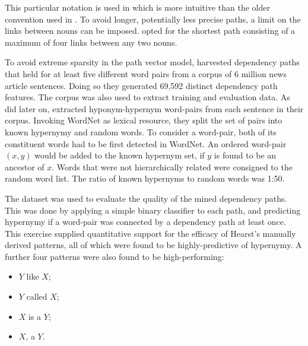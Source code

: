 This particular notation is used in \cite{shwartz2016path} which is more intuitive than the older convention used in \cite{Snow2004}.  To avoid longer, potentially less precise paths, a limit on the links between nouns can be imposed.  \citeauthor{Snow2004} opted for the shortest path consisting of a maximum of four links between any two nouns.

To avoid extreme sparsity in the path vector model, \citet{Snow2004} harvested dependency paths that held for at least five different word pairs from a corpus of 6 million news article sentences.  Doing so they generated 69,592 distinct dependency path features.  The corpus was also used to extract training and evaluation data.  As \citet{wu2012probase} did later on, \citeauthor{Snow2004} extracted hyponym-hypernym word-pairs from each sentence in their corpus.  Invoking WordNet \citep{Miller1995} as lexical resource, they split the set of pairs into known hypernymy and random words.  To consider a word-pair, both of its constituent words had to be first detected in WordNet.  An ordered word-pair $(x, y)$ would be added to the known hypernym set, if $y$ is found to be an ancestor of $x$.  Words that were not hierarchically related were consigned to the random word list.  The ratio of known hypernyms to random words was 1:50.    

The dataset was used to evaluate the quality of the mined dependency paths.  This was done by applying a simple binary classifier to each path, and predicting hypernymy if a word-pair was connected by a dependency path at least once.  This exercise supplied quantitative support for the efficacy of Hearst’s manually derived patterns, all of which were found to be highly-predictive of hypernymy.  A further four patterns were also found to be high-performing:
\begin{itemize}
    \item $Y$ like $X$;
    \item $Y$ called $X$;
    \item $X$ is a $Y$;
    \item $X$, a $Y$.
\end{itemize}

